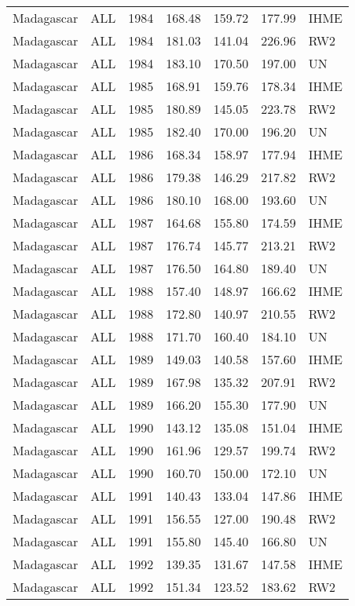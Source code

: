 \begin{longtable}{lllrrrl}
  Madagascar & ALL & 1984 & 168.48 & 159.72 & 177.99 & IHME \\ 
  Madagascar & ALL & 1984 & 181.03 & 141.04 & 226.96 & RW2 \\ 
  Madagascar & ALL & 1984 & 183.10 & 170.50 & 197.00 & UN \\ 
  Madagascar & ALL & 1985 & 168.91 & 159.76 & 178.34 & IHME \\ 
  Madagascar & ALL & 1985 & 180.89 & 145.05 & 223.78 & RW2 \\ 
  Madagascar & ALL & 1985 & 182.40 & 170.00 & 196.20 & UN \\ 
  Madagascar & ALL & 1986 & 168.34 & 158.97 & 177.94 & IHME \\ 
  Madagascar & ALL & 1986 & 179.38 & 146.29 & 217.82 & RW2 \\ 
  Madagascar & ALL & 1986 & 180.10 & 168.00 & 193.60 & UN \\ 
  Madagascar & ALL & 1987 & 164.68 & 155.80 & 174.59 & IHME \\ 
  Madagascar & ALL & 1987 & 176.74 & 145.77 & 213.21 & RW2 \\ 
  Madagascar & ALL & 1987 & 176.50 & 164.80 & 189.40 & UN \\ 
  Madagascar & ALL & 1988 & 157.40 & 148.97 & 166.62 & IHME \\ 
  Madagascar & ALL & 1988 & 172.80 & 140.97 & 210.55 & RW2 \\ 
  Madagascar & ALL & 1988 & 171.70 & 160.40 & 184.10 & UN \\ 
  Madagascar & ALL & 1989 & 149.03 & 140.58 & 157.60 & IHME \\ 
  Madagascar & ALL & 1989 & 167.98 & 135.32 & 207.91 & RW2 \\ 
  Madagascar & ALL & 1989 & 166.20 & 155.30 & 177.90 & UN \\ 
  Madagascar & ALL & 1990 & 143.12 & 135.08 & 151.04 & IHME \\ 
  Madagascar & ALL & 1990 & 161.96 & 129.57 & 199.74 & RW2 \\ 
  Madagascar & ALL & 1990 & 160.70 & 150.00 & 172.10 & UN \\ 
  Madagascar & ALL & 1991 & 140.43 & 133.04 & 147.86 & IHME \\ 
  Madagascar & ALL & 1991 & 156.55 & 127.00 & 190.48 & RW2 \\ 
  Madagascar & ALL & 1991 & 155.80 & 145.40 & 166.80 & UN \\ 
  Madagascar & ALL & 1992 & 139.35 & 131.67 & 147.58 & IHME \\ 
  Madagascar & ALL & 1992 & 151.34 & 123.52 & 183.62 & RW2 \\ 

\end{longtable}
